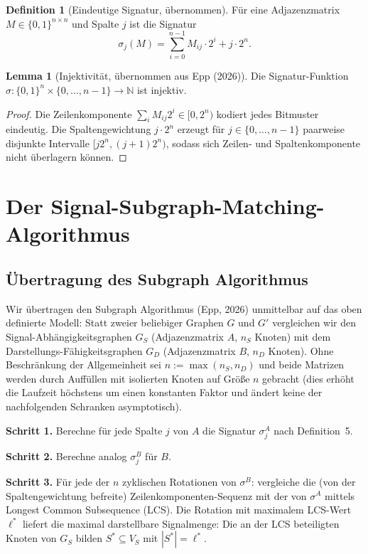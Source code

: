 ﻿\documentclass[a4paper,12pt]{article}
\theoremstyle{definition}
\newtheorem{definition}{Definition}
\newtheorem{lemma}{Lemma}
\begin{document}
\begin{definition}[Eindeutige Signatur, übernommen]
	Für eine Adjazenzmatrix $M \in \{0,1\}^{n \times n}$ und Spalte $j$ ist die Signatur
	\[
	\sigma_j(M) = \sum_{i=0}^{n-1} M_{ij} \cdot 2^i + j \cdot 2^n.
	\]
\end{definition}

\begin{lemma}[Injektivität, übernommen aus Epp (2026)]
\label{lem:injektiv}
	Die Signatur-Funktion $\sigma: \{0,1\}^n \times \{0,\ldots,n-1\} \to \mathbb{N}$ ist injektiv.
\end{lemma}
\begin{proof}
	Die Zeilenkomponente $\sum_i M_{ij} 2^i \in [0, 2^n)$ kodiert jedes Bitmuster eindeutig. Die Spaltengewichtung $j \cdot 2^n$ erzeugt für $j \in \{0,\ldots,n-1\}$ paarweise disjunkte Intervalle $[j 2^n, (j{+}1) 2^n)$, sodass sich Zeilen- und Spaltenkomponente nicht überlagern können.
\end{proof}

\section{Der Signal-Subgraph-Matching-Algorithmus}

\subsection{Übertragung des Subgraph Algorithmus}

Wir übertragen den Subgraph Algorithmus (Epp, 2026) unmittelbar auf das oben definierte Modell: Statt zweier beliebiger Graphen $G$ und $G'$ vergleichen wir den Signal-Abhängigkeitsgraphen $G_S$ (Adjazenzmatrix $A$, $n_S$ Knoten) mit dem Darstellungs-Fähigkeitsgraphen $G_D$ (Adjazenzmatrix $B$, $n_D$ Knoten). Ohne Beschränkung der Allgemeinheit sei $n := \max(n_S, n_D)$ und beide Matrizen werden durch Auffüllen mit isolierten Knoten auf Größe $n$ gebracht (dies erhöht die Laufzeit höchstens um einen konstanten Faktor und ändert keine der nachfolgenden Schranken asymptotisch).

\textbf{Schritt 1.} Berechne für jede Spalte $j$ von $A$ die Signatur $\sigma_j^A$ nach Definition~5.

\textbf{Schritt 2.} Berechne analog $\sigma_j^B$ für $B$.

\textbf{Schritt 3.} Für jede der $n$ zyklischen Rotationen von $\sigma^B$: vergleiche die (von der Spaltengewichtung befreite) Zeilenkomponenten-Sequenz mit der von $\sigma^A$ mittels Longest Common Subsequence (LCS). Die Rotation mit maximalem LCS-Wert $\ell^\ast$ liefert die maximal darstellbare Signalmenge: Die an der LCS beteiligten Knoten von $G_S$ bilden $S^\ast \subseteq V_S$ mit $|S^\ast| = \ell^\ast$.
\end{document}
